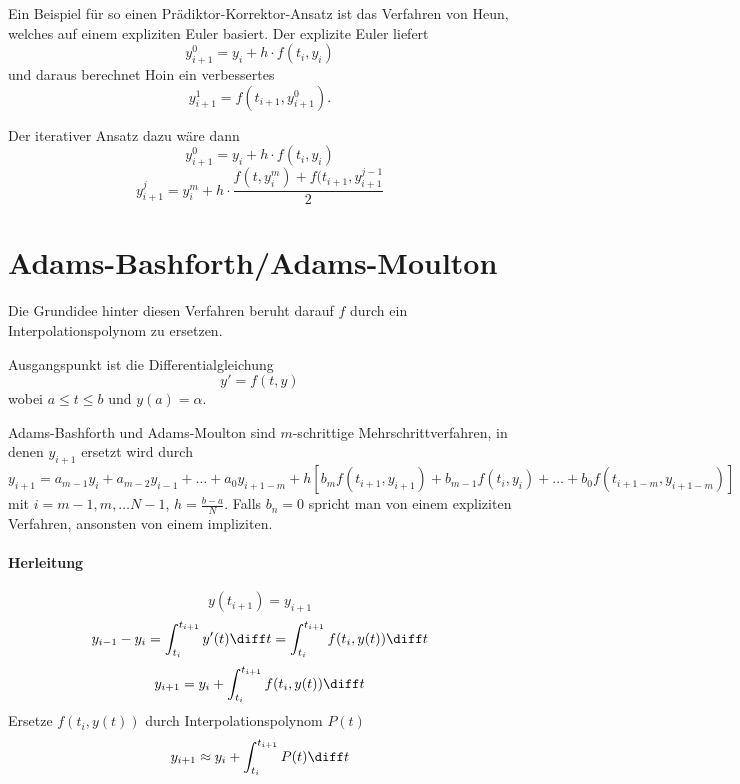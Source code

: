 Ein Beispiel für so einen Prädiktor-Korrektor-Ansatz ist das Verfahren von Heun, welches auf einem expliziten Euler basiert. Der explizite Euler liefert
\begin{equation}
y_{i + 1}^0 = y_i + h \cdot f(t_i, y_i)
\end{equation}
und daraus berechnet Hoin ein verbessertes
\begin{equation}
y_{i + 1}^1 = f(t_{i + 1}, y_{i + 1}^0) .
\end{equation}

Der iterativer Ansatz dazu wäre dann
\begin{equation}
y_{i + 1}^0 = y_i + h \cdot f(t_i, y_i)
\end{equation}
\begin{equation}
y_{i + 1}^j = y_i^m + h \cdot \frac{f(t, y_i^m) + f(t_{i + 1}, y_{i + 1}^{j - 1}}{2}
\end{equation}

\section{Adams-Bashforth/Adams-Moulton}
Die Grundidee hinter diesen Verfahren beruht darauf $f$ durch ein Interpolationspolynom zu ersetzen.

Ausgangspunkt ist die Differentialgleichung
\begin{equation}
y' = f(t, y)
\end{equation}
wobei $a \le t \le b$ und $y(a) = \alpha$.

Adams-Bashforth und Adams-Moulton sind $m$-schrittige Mehrschrittverfahren, in denen $y_{i + 1}$ ersetzt wird durch 
\begin{equation}
y_{i + 1} = a_{m - 1} y_i + a_{m - 2} y_{i - 1} + \dots + a_0 y_{i + 1 - m} + h \left[ b_m f(t_{i + 1}, y_{i + 1}) + b_{m - 1} f(t_i, y_i) + \dots + b_0 f(t_{i + 1 - m}, y_{i + 1 - m}) \right]
\end{equation}
mit $i = m - 1, m, \dots N - 1$, $h = \frac{b - a}{N}$. Falls $b_n = 0$ spricht man von einem expliziten Verfahren, ansonsten von einem impliziten.

\paragraph{Herleitung}
\begin{equation}
y(t_{i + 1}) = y_{i + 1}
\end{equation}
\begin{equation}
y_{i - 1} - y_i = \int_{t_i}^{t_{i + 1}} y'(t) \diff t = \int_{t_i}^{t_{i + 1}} f(t_i, y(t)) \diff t
\end{equation}
\begin{equation}
y_{i + 1} = y_i + \int_{t_i}^{t_{i + 1}} f(t_i, y(t)) \diff t
\end{equation}
Ersetze $f(t_i, y(t)) $ durch Interpolationspolynom $P(t)$
\begin{equation}
y_{i + 1} \approx y_i + \int_{t_i}^{t_{i + 1}} P(t) \diff t
\end{equation}

